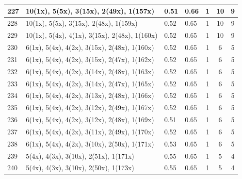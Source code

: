 \begin{small}
\begin{longtable}{|p{0.5cm}|p{9cm}|p{1.3cm}|p{1.3cm}|c|c|c|}
  227 & 10(1x), 5(5x), 3(15x), 2(49x), 1(157x) & \cellcolor{colorGood}  0.51 & \cellcolor{colorGood} 0.66 & 1 & 10 & \cellcolor{colorGood} 9 \\   \hline
  228 & 10(1x), 5(5x), 3(15x), 2(48x), 1(159x) & \cellcolor{colorGood}  0.52 & \cellcolor{colorGood} 0.65 & 1 & 10 & \cellcolor{colorGood} 9 \\   \hline
  229 & 10(1x), 5(4x), 4(1x), 3(15x), 2(48x), 1(160x) & \cellcolor{colorGood}  0.52 & \cellcolor{colorGood} 0.65 & 1 & 10 & \cellcolor{colorGood} 9 \\   \hline
  230 & 6(1x), 5(4x), 4(2x), 3(15x), 2(48x), 1(160x) & \cellcolor{colorGood}  0.52 & \cellcolor{colorGood} 0.65 & 1 & 6 & \cellcolor{colorGood} 5 \\   \hline
  231 & 6(1x), 5(4x), 4(2x), 3(15x), 2(47x), 1(162x) & \cellcolor{colorGood}  0.52 & \cellcolor{colorGood} 0.65 & 1 & 6 & \cellcolor{colorGood} 5 \\   \hline
  232 & 6(1x), 5(4x), 4(2x), 3(14x), 2(48x), 1(163x) & \cellcolor{colorGood}  0.52 & \cellcolor{colorGood} 0.65 & 1 & 6 & \cellcolor{colorGood} 5 \\   \hline
  233 & 6(1x), 5(4x), 4(2x), 3(14x), 2(47x), 1(165x) & \cellcolor{colorGood}  0.52 & \cellcolor{colorGood} 0.65 & 1 & 6 & \cellcolor{colorGood} 5 \\   \hline
  234 & 6(1x), 5(4x), 4(2x), 3(13x), 2(48x), 1(166x) & \cellcolor{colorGood}  0.52 & \cellcolor{colorGood} 0.65 & 1 & 6 & \cellcolor{colorGood} 5 \\   \hline
  235 & 6(1x), 5(4x), 4(2x), 3(12x), 2(49x), 1(167x) & \cellcolor{colorGood}  0.52 & \cellcolor{colorGood} 0.65 & 1 & 6 & \cellcolor{colorGood} 5 \\   \hline
  236 & 6(1x), 5(4x), 4(2x), 3(12x), 2(48x), 1(169x) & \cellcolor{colorGood}  0.51 & \cellcolor{colorGood} 0.65 & 1 & 6 & \cellcolor{colorGood} 5 \\   \hline
  237 & 6(1x), 5(4x), 4(2x), 3(11x), 2(49x), 1(170x) & \cellcolor{colorGood}  0.52 & \cellcolor{colorGood} 0.65 & 1 & 6 & \cellcolor{colorGood} 5 \\   \hline
  238 & 6(1x), 5(4x), 4(2x), 3(10x), 2(50x), 1(171x) & \cellcolor{colorGood}  0.53 & \cellcolor{colorGood} 0.65 & 1 & 6 & \cellcolor{colorGood} 5 \\   \hline
  239 & 5(4x), 4(3x), 3(10x), 2(51x), 1(171x) & \cellcolor{colorOK}  0.55 & \cellcolor{colorOK} 0.65 & 1 & 5 & \cellcolor{colorGood} 4 \\   \hline
  240 & 5(4x), 4(3x), 3(10x), 2(50x), 1(173x) & \cellcolor{colorOK}  0.55 & \cellcolor{colorOK} 0.65 & 1 & 5 & \cellcolor{colorGood} 4 \\   \hline

\end{longtable}
\end{small}
